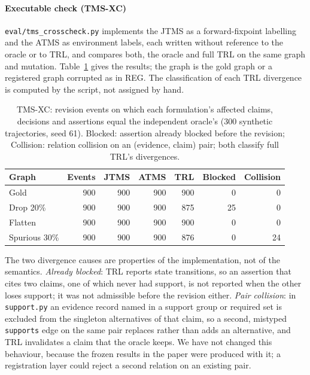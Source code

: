 \documentclass[journal]{IEEEtran}
\begin{document}
\paragraph{Executable check (TMS-XC)} \texttt{eval/tms\_crosscheck.py} implements the JTMS as a forward-fixpoint labelling and the ATMS as environment labels, each written without reference to the oracle or to TRL, and compares both, the oracle and full TRL on the same graph and mutation. Table~\ref{tab:tms_xc} gives the results; the graph is the gold graph or a registered graph corrupted as in REG. The classification of each TRL divergence is computed by the script, not assigned by hand.

\begin{table}[!t]
\centering
\caption{TMS-XC: revision events on which each formulation's affected claims, decisions and assertions equal the independent oracle's (300 synthetic trajectories, seed 61). Blocked: assertion already blocked before the revision; Collision: relation collision on an (evidence, claim) pair; both classify full TRL's divergences.}
\label{tab:tms_xc}
\scriptsize
\setlength{\tabcolsep}{3pt}
\begin{tabular}{@{}lrrrrrr@{}}
\toprule
Graph & Events & JTMS & ATMS & TRL & Blocked & Collision \\
\midrule
Gold & 900 & 900 & 900 & 900 & 0 & 0 \\
Drop 20\% & 900 & 900 & 900 & 875 & 25 & 0 \\
Flatten & 900 & 900 & 900 & 900 & 0 & 0 \\
Spurious 30\% & 900 & 900 & 900 & 876 & 0 & 24 \\
\bottomrule
\end{tabular}
\end{table}


The two divergence causes are properties of the implementation, not of the semantics. \emph{Already blocked}: TRL reports state transitions, so an assertion that cites two claims, one of which never had support, is not reported when the other loses support; it was not admissible before the revision either. \emph{Pair collision}: in \texttt{support.py} an evidence record named in a support group or required set is excluded from the singleton alternatives of that claim, so a second, mistyped \texttt{supports} edge on the same pair replaces rather than adds an alternative, and TRL invalidates a claim that the oracle keeps. We have not changed this behaviour, because the frozen results in the paper were produced with it; a registration layer could reject a second relation on an existing pair.
\end{document}
